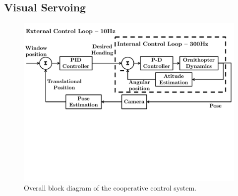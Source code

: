 \documentclass{aamas2013}
\begin{document}
\subsection{Visual Servoing}
\label{sec:visual_servoing_concept}

\begin{figure}[tb]
\centering
\includegraphics[width=\linewidth]{figures/block_diagrams.pdf}
\caption{Overall block diagram of the cooperative control system.}
\label{fig:block_diagram}
\end{figure}
\end{document}
